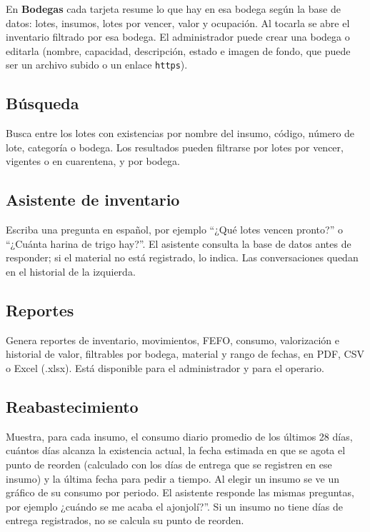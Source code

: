 En \textbf{Bodegas} cada tarjeta resume lo que hay en esa bodega según la base de datos: lotes, insumos, lotes por vencer, valor y ocupación. Al tocarla se abre el inventario filtrado por esa bodega. El administrador puede crear una bodega o editarla (nombre, capacidad, descripción, estado e imagen de fondo, que puede ser un archivo subido o un enlace \texttt{https}).

\subsection*{Búsqueda}
Busca entre los lotes con existencias por nombre del insumo, código, número de lote, categoría o bodega. Los resultados pueden filtrarse por lotes por vencer, vigentes o en cuarentena, y por bodega.

\subsection*{Asistente de inventario}
Escriba una pregunta en español, por ejemplo ``¿Qué lotes vencen pronto?'' o ``¿Cuánta harina de trigo hay?''. El asistente consulta la base de datos antes de responder; si el material no está registrado, lo indica. Las conversaciones quedan en el historial de la izquierda.

\subsection*{Reportes}
Genera reportes de inventario, movimientos, FEFO, consumo, valorización e historial de valor, filtrables por bodega, material y rango de fechas, en PDF, CSV o Excel (.xlsx). Está disponible para el administrador y para el operario.

\subsection*{Reabastecimiento}
Muestra, para cada insumo, el consumo diario promedio de los últimos 28 días, cuántos días alcanza la existencia actual, la fecha estimada en que se agota el punto de reorden (calculado con los días de entrega que se registren en ese insumo) y la última fecha para pedir a tiempo. Al elegir un insumo se ve un gráfico de su consumo por periodo. El asistente responde las mismas preguntas, por ejemplo ¿cuándo se me acaba el ajonjolí?''. Si un insumo no tiene días de entrega registrados, no se calcula su punto de reorden.

